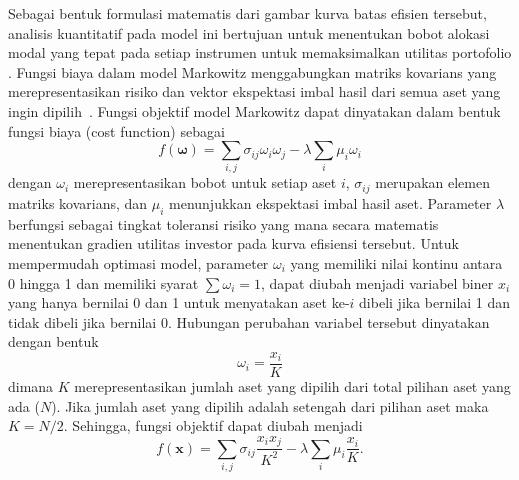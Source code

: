Sebagai bentuk formulasi matematis dari gambar kurva batas efisien tersebut, analisis kuantitatif pada model ini bertujuan untuk menentukan bobot alokasi modal yang tepat pada setiap instrumen untuk memaksimalkan utilitas portofolio \cite{abdul_hali_markowitz_2020}. Fungsi biaya dalam model Markowitz menggabungkan matriks kovarians yang merepresentasikan risiko dan vektor ekspektasi imbal hasil dari semua aset yang ingin dipilih~\cite{schwert_chapter_2003}. Fungsi objektif model Markowitz dapat dinyatakan dalam bentuk fungsi biaya (cost function) sebagai
\begin{equation}
\label{eq:lagrangian_markowitz}
f(\mathbf{\omega}) = \sum_{i,j} \sigma_{ij} \omega_i \omega_j - \lambda \sum_i \mu_i \omega_i
\end{equation}
dengan $\omega_i$ merepresentasikan bobot untuk setiap aset $i$, $\sigma_{ij}$ merupakan elemen matriks kovarians, dan $\mu_i$ menunjukkan ekspektasi imbal hasil aset. Parameter $\lambda$ berfungsi sebagai tingkat toleransi risiko yang mana secara matematis menentukan gradien utilitas investor pada kurva efisiensi tersebut. Untuk mempermudah optimasi model, parameter $\omega_i$ yang memiliki nilai kontinu antara 0 hingga 1 dan memiliki syarat $\sum \omega_i = 1$, dapat diubah menjadi variabel biner $x_i$ yang hanya bernilai 0 dan 1 untuk menyatakan aset ke-$i$ dibeli jika bernilai 1 dan tidak dibeli jika bernilai 0. Hubungan perubahan variabel tersebut dinyatakan dengan bentuk
\begin{equation}
\label{eq:binary_optimization}
\omega_i = \frac{x_i}{K}
\end{equation}
dimana $K$ merepresentasikan jumlah aset yang dipilih dari total pilihan aset yang ada ($N$). Jika jumlah aset yang dipilih adalah setengah dari pilihan aset maka $K = N/2$. Sehingga, fungsi objektif dapat diubah menjadi
\begin{equation}
\label{eq:lagrangian_markowitz_binary}
f(\mathbf{x}) = \sum_{i,j} \sigma_{ij} \frac{x_i x_j}{K^2} - \lambda \sum_i \mu_i \frac{x_i}{K}.
\end{equation}